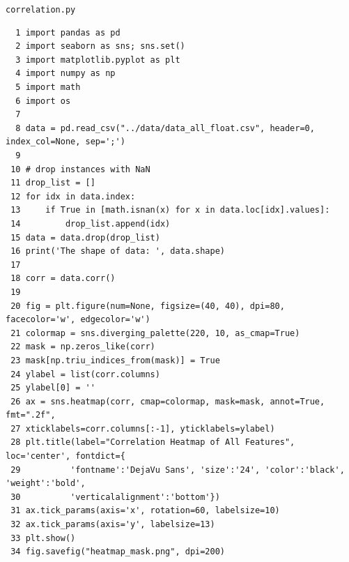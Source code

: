 \documentclass[10pt,aps,prb,amsmath,amssymb,twocolumn,letterpaper,nobalancelastpage,final,citeautoscript,floatfix,raggedbottom,superscriptaddress]{revtex4-1}
\begin{document}
\clearpage
\noindent \hypertarget{correlation}{\texttt{\Large{correlation.py}}}\
\begin{lstlisting}
  1 import pandas as pd
  2 import seaborn as sns; sns.set()
  3 import matplotlib.pyplot as plt
  4 import numpy as np
  5 import math
  6 import os
  7 
  8 data = pd.read_csv("../data/data_all_float.csv", header=0, index_col=None, sep=';')
  9 
 10 # drop instances with NaN
 11 drop_list = []
 12 for idx in data.index:
 13     if True in [math.isnan(x) for x in data.loc[idx].values]:
 14         drop_list.append(idx)
 15 data = data.drop(drop_list)
 16 print('The shape of data: ', data.shape)
 17 
 18 corr = data.corr()
 19 
 20 fig = plt.figure(num=None, figsize=(40, 40), dpi=80, facecolor='w', edgecolor='w')
 21 colormap = sns.diverging_palette(220, 10, as_cmap=True)
 22 mask = np.zeros_like(corr)
 23 mask[np.triu_indices_from(mask)] = True
 24 ylabel = list(corr.columns)
 25 ylabel[0] = ''
 26 ax = sns.heatmap(corr, cmap=colormap, mask=mask, annot=True, fmt=".2f",
 27 xticklabels=corr.columns[:-1], yticklabels=ylabel)
 28 plt.title(label="Correlation Heatmap of All Features", loc='center', fontdict={
 29          'fontname':'DejaVu Sans', 'size':'24', 'color':'black', 'weight':'bold',
 30          'verticalalignment':'bottom'})
 31 ax.tick_params(axis='x', rotation=60, labelsize=10)
 32 ax.tick_params(axis='y', labelsize=13)
 33 plt.show()
 34 fig.savefig("heatmap_mask.png", dpi=200)
\end{lstlisting}
\end{document}
